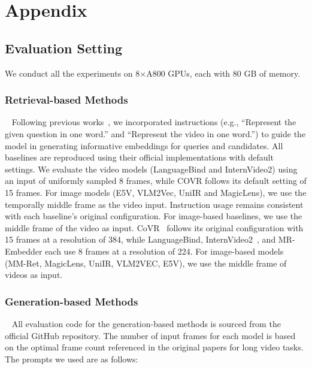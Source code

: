 \documentclass{article}
\begin{document}








\section{Appendix}
\label{sec:appendix}

\subsection{Evaluation Setting}\label{app:evaluation}

We conduct all the experiments on 8×A800 GPUs, each with 80 GB of memory.
\subsubsection{Retrieval-based Methods}~\label{app:retrieval_setting}
Following previous works~\cite{jiang2025vlm2vec, jiang2024e5}, we incorporated instructions (e.g., ``Represent the given question in one word.'' and ``Represent the video in one word.'') to guide the model in generating informative embeddings for queries and candidates.  All baselines are reproduced using their official implementations with default settings. We evaluate the video models (LanguageBind and InternVideo2) using an input of uniformly sampled 8 frames, while COVR follows its default setting of 15 frames. For image models (E5V, VLM2Vec, UniIR and MagicLens), we use the temporally middle frame as the video input. Instruction usage remains consistent with each baseline’s original configuration. For image-based baselines, we use the middle frame of the video as input. CoVR~\cite{ventura2024covr} follows its original configuration with 15 frames at a resolution of 384, while LanguageBind, InternVideo2~\cite{wang2025internvideo2}, and MR-Embedder each use 8 frames at a resolution of 224.  For image-based models (MM-Ret, MagicLens, UniIR, VLM2VEC, E5V), we use the middle frame of videos as input.



\subsubsection{Generation-based Methods}~\label{app:generation_setting}
All evaluation code for the generation-based methods is sourced from the official GitHub repository. The number of input frames for each model is based on the optimal frame count referenced in the original papers for long video tasks. The prompts we used are as follows:
\end{document}
